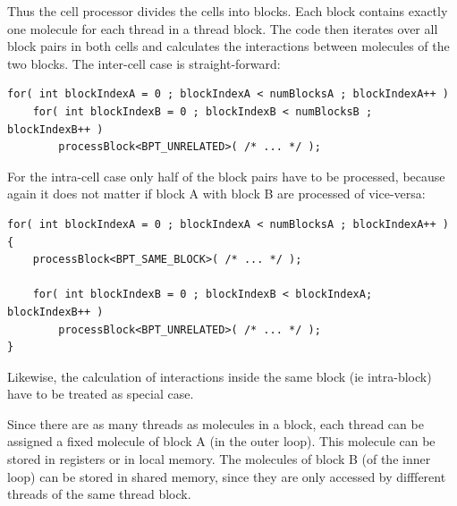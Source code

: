 Thus the cell processor divides the cells into blocks. Each block contains exactly one molecule for each thread in a thread block.
The code then iterates over all block pairs in both cells and calculates the interactions between molecules of the two blocks.
The inter-cell case is straight-forward:
\begin{lstlisting}[label=intercellloop,caption=inter-cell block processing (thread block cell processor)]
for( int blockIndexA = 0 ; blockIndexA < numBlocksA ; blockIndexA++ )
	for( int blockIndexB = 0 ; blockIndexB < numBlocksB ; blockIndexB++ )
		processBlock<BPT_UNRELATED>( /* ... */ );
\end{lstlisting}
For the intra-cell case only half of the block pairs have to be processed, because again it does not matter if block A with block B are processed of vice-versa:
\begin{lstlisting}[label=intracellloop,caption=intra-cell block processing (thread block cell processor)]
for( int blockIndexA = 0 ; blockIndexA < numBlocksA ; blockIndexA++ ) {
	processBlock<BPT_SAME_BLOCK>( /* ... */ );
	
	for( int blockIndexB = 0 ; blockIndexB < blockIndexA; blockIndexB++ )
		processBlock<BPT_UNRELATED>( /* ... */ );
}
\end{lstlisting}
Likewise, the calculation of interactions inside the same block (ie intra-block) have to be treated as special case.

Since there are as many threads as molecules in a block, each thread can be assigned a fixed molecule of block A (in the outer loop). This molecule can be stored in registers or in local memory.
The molecules of block B (of the inner loop) can be stored in shared memory, since they are only accessed by diffferent threads of the same thread block.

